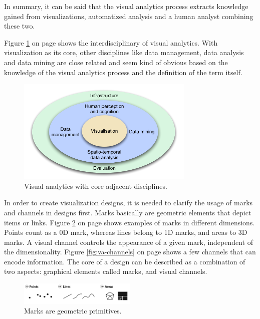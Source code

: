 In summary, it can be said that the visual analytics process extracts knowledge gained from visualizations, automatized analysis and a human analyst combining these two.

Figure \ref{fig:va-related} on page \pageref{fig:va-related} shows the interdisciplinary of visual analytics. With visualization as its core, other disciplines like data management, data analysis and data mining are close related and seem kind of obvious based on the knowledge of the visual analytics process and the definition of the term itself.

\begin{figure}[!htb]
\centering
\includegraphics[height=5cm,keepaspectratio]{images/va/va-related.png}
\caption[
    Visual analytics with core adjacent disciplines .
]{Visual analytics with core adjacent disciplines.}
\label{fig:va-related}
\end{figure}

In order to create visualization designs, it is needed to clarify the usage of marks and channels in designs first. Marks basically are geometric elements that depict items or links. Figure \ref{fig:va-marks} on page \pageref{fig:va-marks} shows examples of marks in different dimensions. Points count as a 0D mark, whereas lines belong to 1D marks, and areas to 3D marks. A visual channel controls the appearance of a given mark, independent of the dimensionality. Figure \ref{fig:va-channels} on page \pageref{fig:va-channels} shows a few channels that can encode information. The core of a design can be described as a combination of two aspects: graphical elements called marks, and visual channels.

\begin{figure}[!htb]
\centering
\includegraphics[width=0.5\textwidth,keepaspectratio]{images/va/marks.png}
\caption[
    Marks are geometric primitives .
]{Marks are geometric primitives.}
\label{fig:va-marks}
\end{figure}

